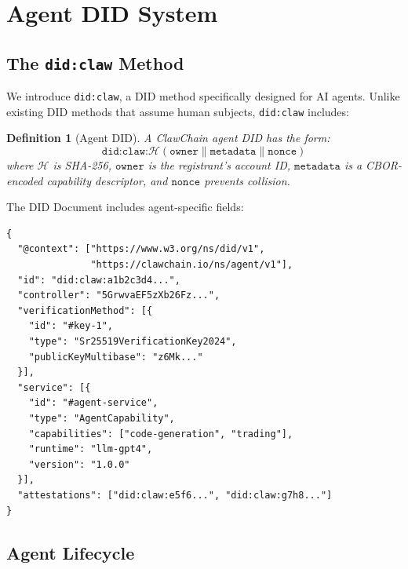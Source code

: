 \documentclass{article}
\newtheorem{definition}{Definition}
\begin{document}

\section{Agent DID System}\label{sec:did}

\subsection{The \texttt{did:claw} Method}

We introduce \texttt{did:claw}, a DID method specifically designed for AI agents. Unlike existing DID methods that assume human subjects, \texttt{did:claw} includes:

\begin{definition}[Agent DID]
A ClawChain agent DID has the form:
\begin{equation}
    \texttt{did:claw:}\mathcal{H}(\texttt{owner} \| \texttt{metadata} \| \texttt{nonce})
\end{equation}
where $\mathcal{H}$ is SHA-256, $\texttt{owner}$ is the registrant's account ID, $\texttt{metadata}$ is a CBOR-encoded capability descriptor, and $\texttt{nonce}$ prevents collision.
\end{definition}

The DID Document includes agent-specific fields:

\begin{lstlisting}[basicstyle=\ttfamily\scriptsize, frame=single, xleftmargin=1em]
{
  "@context": ["https://www.w3.org/ns/did/v1",
               "https://clawchain.io/ns/agent/v1"],
  "id": "did:claw:a1b2c3d4...",
  "controller": "5GrwvaEF5zXb26Fz...",
  "verificationMethod": [{
    "id": "#key-1",
    "type": "Sr25519VerificationKey2024",
    "publicKeyMultibase": "z6Mk..."
  }],
  "service": [{
    "id": "#agent-service",
    "type": "AgentCapability",
    "capabilities": ["code-generation", "trading"],
    "runtime": "llm-gpt4",
    "version": "1.0.0"
  }],
  "attestations": ["did:claw:e5f6...", "did:claw:g7h8..."]
}
\end{lstlisting}

\subsection{Agent Lifecycle}
\end{document}
